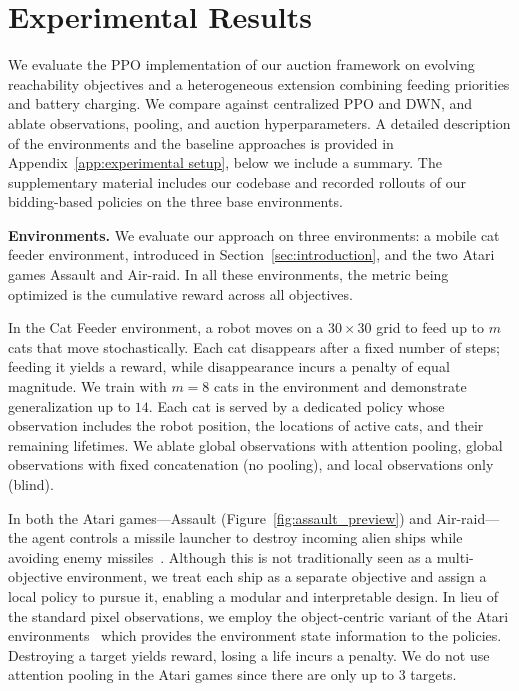 \section{Experimental Results}\label{sec:experimental-results}

We evaluate the PPO implementation of our auction framework on evolving reachability objectives and a heterogeneous extension combining feeding priorities and battery charging.
We compare against centralized PPO and DWN, and ablate observations, pooling, and auction hyperparameters.
A detailed description of the environments and the baseline approaches is provided in Appendix~\ref{app:experimental setup}, below we include a summary.
The supplementary material includes our codebase and recorded rollouts of our bidding-based policies on the three base environments.

\textbf{Environments.}
We evaluate our approach on three environments: a mobile cat feeder environment, introduced in Section~\ref{sec:introduction}, and the two Atari games Assault and Air-raid.
In all these environments, the metric being optimized is the cumulative reward across all objectives.

In the Cat Feeder environment, a robot moves on a $30\times 30$ grid to feed up to $m$ cats that move stochastically.
Each cat disappears after a fixed number of steps; feeding it yields a reward, while disappearance incurs a penalty of equal magnitude.
We train with $m=8$ cats in the environment and demonstrate generalization up to $14$.
Each cat is served by a dedicated policy whose observation includes the robot position, the locations of active cats, and their remaining lifetimes.
We ablate global observations with attention pooling, global observations with fixed concatenation (no pooling), and local observations only (blind).

In both the Atari games---Assault (Figure~\ref{fig:assault_preview}) and Air-raid---the agent controls a missile launcher to destroy incoming alien ships while avoiding enemy missiles~\citep{bellemare13arcade}.
Although this is not traditionally seen as a multi-objective environment, we treat each ship as a separate objective and assign a local policy to pursue it, enabling a modular and interpretable design.
In lieu of the standard pixel observations, we employ the object-centric variant of the Atari environments~\citep{delfosse2023ocatari} which provides the environment state information to the policies.
Destroying a target yields reward, losing a life incurs a penalty.
We do not use attention pooling in the Atari games since there are only up to 3 targets.


